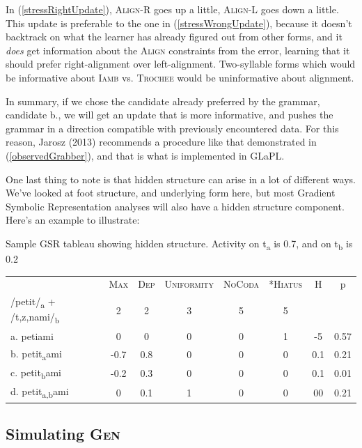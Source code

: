 \documentclass[12]{article}
\begin{document}
In (\ref{stressRightUpdate}), \textsc{Align-R} goes up a little, \textsc{Align-L} goes down a little.  This update is preferable to the one in (\ref{stressWrongUpdate}), because it doesn't backtrack on what the learner has already figured out from other forms, and it {\it does} get information about the \textsc{Align} constraints from the error, learning that it should prefer right-alignment over left-alignment.  Two-syllable forms which would be informative about \textsc{Iamb} vs. \textsc{Trochee} would be uninformative about alignment.

In summary, if we chose the candidate already preferred by the grammar, candidate b., we will get an update that is more informative, and pushes the grammar in a direction compatible with previously encountered data.  For this reason, Jarosz (2013) recommends a procedure like that demonstrated in (\ref{observedGrabber}), and that is what is implemented in GLaPL.

One last thing to note is that hidden structure can arise in a lot of different ways.  We've looked at foot structure, and underlying form here, but most Gradient Symbolic Representation analyses will also have a hidden structure component.  Here's an example to illustrate:


\begin{exe}
	\ex\label{GSRhidden} Sample GSR tableau showing hidden structure.  Activity on t\textsubscript{a} is 0.7, and on t\textsubscript{b} is 0.2
	
	\begin{tabular}{l|ccccc|cc}
				& \textsc{Max} & \textsc{Dep} & \textsc{Uniformity} & \textsc{NoCoda} & \textsc{*Hiatus} & H & p \\
	/petit/\textsubscript{a} + /{t,z,n}ami/\textsubscript{b} & 2 & 2 & 3 & 5 & 5 & & \\
	a. petiami &0&0&0&0& 1 & -5 & 0.57 \\
	b. petit\textsubscript{a}ami & -0.7 & 0.8 &0&0&0& 0.1 &0.21 \\
	c. petit\textsubscript{b}ami & -0.2 & 0.3 &0&0&0& 0.1 &0.01 \\
	d. petit\textsubscript{a,b}ami &0& 0.1 & 1&0&0& 00 & 0.21 \\
	
	\end{tabular}
	
\end{exe}


	  
	\subsection{Simulating \textsc{Gen}}
\end{document}
